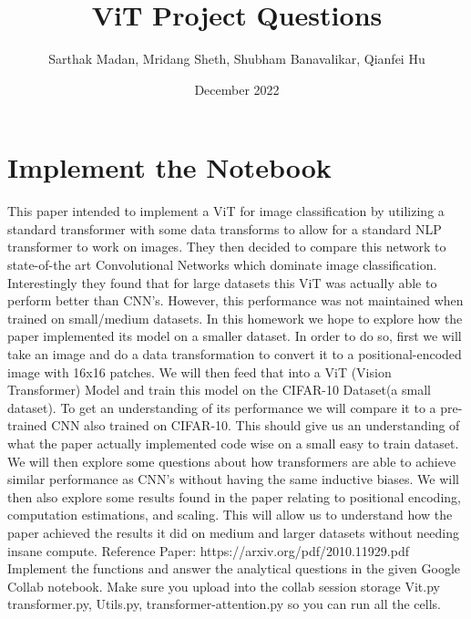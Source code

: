 \documentclass{article}
\title{\textbf{ViT Project Questions}}
\date{December 2022}
\author{Sarthak Madan, Mridang Sheth, Shubham Banavalikar, Qianfei Hu }
\begin{document}
\maketitle
\section{Implement the Notebook}
\bigbreak
This paper intended to implement a ViT for image classification by utilizing a standard transformer with some data transforms to allow for a standard NLP transformer to work on images. They then decided to compare this network to state-of-the art Convolutional Networks which dominate image classification. Interestingly they found that for large datasets this ViT was actually able to perform better than CNN’s. However, this performance was not maintained when trained on small/medium datasets.
\medbreak
\noindent In this homework we hope to explore how the paper implemented its model on a smaller dataset. In order to do so, first we will take an image and do a data transformation to convert it to a positional-encoded image with 16x16 patches. We will then feed that into a ViT (Vision Transformer) Model and train this model on the CIFAR-10 Dataset(a small dataset). To get an understanding of its performance we will compare it to a pre-trained CNN also trained on CIFAR-10. This should give us an understanding of what the paper actually implemented code wise on a small easy to train dataset.
\medbreak
\noindent We will then explore some questions about how transformers are able to achieve similar performance as CNN’s without having the same inductive biases. We will then also explore some results found in the paper relating to positional encoding, computation estimations, and scaling. This will allow us to understand how the paper achieved the results it did on medium and larger datasets without needing insane compute. Reference Paper: https://arxiv.org/pdf/2010.11929.pdf
\medbreak
\noindent Implement the functions and answer the analytical questions in the given Google Collab notebook. Make sure you upload into the collab session storage Vit.py transformer.py, Utils.py, transformer-attention.py so you can run all the cells.
\end{document}
